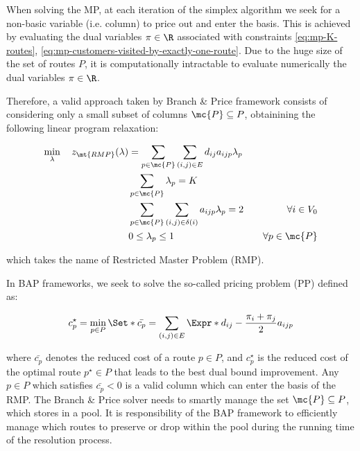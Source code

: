 When solving the MP, at each iteration of the simplex algorithm we seek for a non-basic variable (i.e. column) to price out and enter the basis.
This is achieved by evaluating the dual variables $\pi \in \R$ associated with constraints \eqref{eq:mp-K-routes}, \eqref{eq:mp-customers-visited-by-exactly-one-route}.
Due to the huge size of the set of routes $P$, it is computationally intractable to evaluate numerically the dual variables $\pi \in \R$.

\medskip

Therefore, a valid approach taken by Branch \& Price framework consists of considering only a small subset of columns $\mc{P} \subseteq P$, obtainining the following linear program relaxation:

\begin{align}
	\min_{\lambda} \quad z_\mt{RMP}(\lambda) & = \sum_{p \in \mc{P}} \sum_{(i, j) \in E} d_{ij} a_{ijp} \lambda_p \label{eq:rmp-obj-func}                                                                                                                              \\
	                                         & \sum_{p \in \mc{P}} \lambda_{p} = K                                                        & \label{eq:rmp-K-routes}                                                                                                    \\
	                                         & \sum_{p \in \mc{P}} \sum_{(i, j) \in \delta(i)} a_{ijp} \lambda_p = 2                      & \quad \forall i \in V_0                                              \label{eq:rmp-customers-visited-by-exactly-one-route} \\
	                                         & 0 \le \lambda_p \le 1                                                                      & \quad \forall p \in \mc{P} \label{eq:rmp-lambda-mip-var-bounds}
\end{align}

which takes the name of Restricted Master Problem (RMP).

In BAP frameworks, we seek to solve the so-called pricing problem (PP) defined as:

\begin{equation}
	{c^\star_p} = \min_{p \in P} \Set*{ \bar{c_p} = \sum_{(i, j) \in E} \Expr*{d_{ij} - \frac{\pi_i + \pi_j}{2}} a_{ijp}  }
\end{equation}

where $\bar{c_p}$ denotes the reduced cost of a route $p \in P$, and $c^\star_p$ is the reduced cost of the optimal route $p^\star \in P$ that leads to the best dual bound improvement.
Any $p \in P$ which satisfies $\bar{c_p} < 0$ is a valid column which can enter the basis of the RMP.
The Branch \& Price solver needs to smartly manage the set $\mc{P} \subseteq P$, which stores in a pool.
It is responsibility of the BAP framework to efficiently manage which routes to preserve or drop within the pool during the running time of the resolution process.

